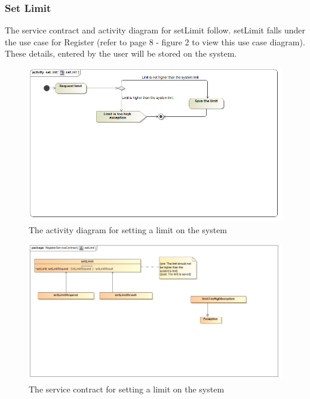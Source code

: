 \documentclass[a4paper,12pt]{article}
\begin{document}
\subsubsection{Set Limit}
The service contract and activity diagram for setLimit follow. setLimit falls under the use case for Register (refer to page 8 - figure 2 to view this use case diagram). These details, entered by the user will be stored on the system. 
\begin{figure}[H]
  \centering
    \includegraphics[width=1.0\textwidth]{../diagrams/Register/ActivityDiagrams/setLimit.png}
    \caption{The activity diagram for setting a limit on the system} 
\end{figure}
\begin{figure}[H]
  \centering
    \includegraphics[width=1.0\textwidth]{../diagrams/Register/ServiceContractsRegister/setLimit.png}
    \caption{The service contract for setting a limit on the system} 
\end{figure}
\end{document}

